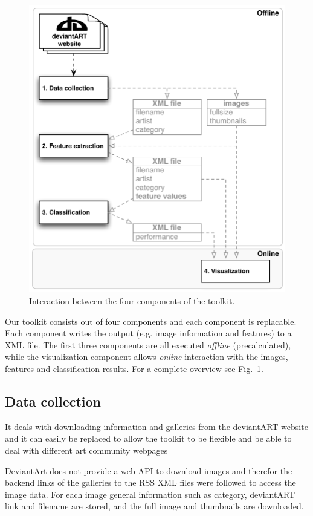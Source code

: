 \begin{figure}[htb]
  \centering
  \includegraphics[width=1\linewidth]{img/components.pdf}
  \caption{Interaction between the four components of the toolkit.}
  \label{fig:components}
\end{figure}

Our toolkit consists out of four components and each component is replacable.
Each component writes the output (e.g. image information and features) to a XML file.
The first three components are all executed \textit{offline} (precalculated), while the visualization component allows \textit{online} interaction with the images, features and classification results.
For a complete overview see Fig.~\ref{fig:components}.

\subsection{Data collection}
It deals with downloading information and galleries from the deviantART website and it can easily be replaced to allow the toolkit to be flexible and be able to deal with different art community webpages

DeviantArt does not provide a web API to download images and therefor the backend links of the galleries to the RSS XML files were followed to access
the image data. For each image general information such as category, deviantART link and filename are stored, and the full image and 
thumbnails are downloaded.

